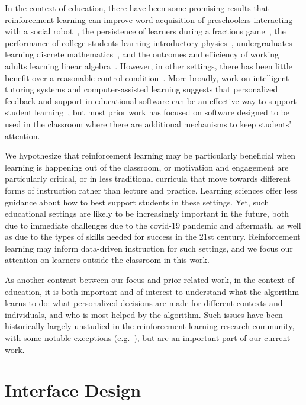 \documentclass[sn-mathphys,Numbered]{sn-jnl}%
\theoremstyle{thmstyleone}%
\theoremstyle{thmstyletwo}%
\theoremstyle{thmstylethree}%
\begin{document}
In the context of education, there have been some promising results that reinforcement learning can improve word acquisition of preschoolers interacting with a social robot~\cite{park2019model},  the persistence of learners during a fractions game~\cite{mandel2014offline}, the performance of college students learning introductory physics~\cite{chi2011empirically}, undergraduates learning discrete  mathematics~\cite{zhou2019hierarchical}, 
and the outcomes and efficiency of working adults learning linear algebra~\cite{bassen2020reinforcement}. However, in other settings, there has been little benefit over a reasonable control condition~\cite{rowe2015improving,doroudi2019s}. 
More broadly, work on intelligent tutoring systems and computer-assisted learning suggests that personalized feedback and support in educational software can be an effective way to support student learning~\cite{corbett2001cognitive,beal2010evaluation,vanlehn2011relative}, but most prior work has focused on software designed to be used in the classroom where there are additional mechanisms to keep students' attention. %

We hypothesize that reinforcement learning may be particularly beneficial when learning is happening out of the classroom, or motivation and engagement are particularly critical, or in less traditional curricula that move towards different forms of instruction rather than lecture and practice. Learning sciences offer less guidance about how to best support students in these settings. Yet, such educational settings are likely to be increasingly important in the future, both due to immediate challenges due to the covid-19 pandemic and aftermath, as well as due to the types of skills needed for success in the 21st century. Reinforcement learning may inform  data-driven instruction for such settings, and we focus our attention on learners outside the classroom in this work. 

As another contrast between our focus and prior related work, in the context of education, it is both important and of interest to understand what the algorithm learns to do: what personalized decisions are made for different contexts and individuals, and who is most helped by the algorithm. Such issues have been historically largely unstudied in the reinforcement learning research community, with some notable exceptions (e.g.~\cite{shen2016reinforcement,zhou2022leveraging}),  but are an important part of our current work. 

\section{Interface Design}\label{sec2}
\end{document}
